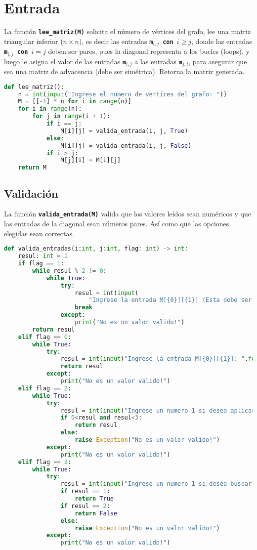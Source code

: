 \section{Entrada}
La función \texttt{\textbf{lee\_matriz(M)}} solicita el número de vértices del grafo, lee una matriz triangular inferior ($n\times n$), es decir las entradas \texttt{\textbf{m$_{i,j}$ con $i\ge j$}}, donde las  entradas \texttt{\textbf{m$_{i,j}$ con $i=j$}} deben ser pares, pues la diagonal representa a los bucles (loops), y luego le asigna el valor de las entradas \texttt{\textbf{m$_{i,j}$}} a las entradas \texttt{\textbf{m$_{j,i}$}}, para asegurar que sea una matriz de adyacencia (debe ser simétrica). Retorna la matriz generada.
\begin{lstlisting}[language=python, caption=Función lee\_matriz()]
def lee_matriz():
    n = int(input("Ingrese el numero de vertices del grafo: "))
    M = [[-1] * n for i in range(n)]
    for i in range(n):
        for j in range(i + 1):
            if i == j:
                M[i][j] = valida_entrada(i, j, True)
            else:
                M[i][j] = valida_entrada(i, j, False)
            if i > j:
                M[j][i] = M[i][j]
    return M
\end{lstlisting}
\subsection{Validación}
La función \texttt{\textbf{valida\_entrada(M)}} valida que los valores leídos sean numéricos y que las entradas de la diagonal sean números pares.
Así como que las opciones elegidas sean correctas.
\begin{lstlisting}[language=python, caption=Función valida\_entrada()]def valida_entradas(i:int, j:int, flag: int) -> int:
    resul: int = 1
    if flag == 1:
        while resul % 2 != 0:
            while True:
                try:
                    resul = int(input(
                        "Ingrese la entrada M[{0}][{1}] (Esta debe ser par): ".format(str(i + 1), str(j + 1))))
                    break
                except:
                    print("No es un valor valido!")
        return resul
    elif flag == 0:
        while True:
            try:
                resul = int(input("Ingrese la entrada M[{0}][{1}]: ".format(str(i + 1), str(j + 1))))
                return resul
            except:
                print("No es un valor valido!")
    elif flag == 2:
        while True:
            try:
                resul = int(input("Ingrese un numero 1 si desea aplicar busqueda en anchura y un 2 si desea aplicar busqueda en profundidad: "))
                if 0<resul and resul<3:
                    return resul
                else:
                    raise Exception("No es un valor valido!")
            except:
                print("No es un valor valido!")
    elif flag == 3:
        while True:
            try:
                resul = int(input("Ingrese un numero 1 si desea buscar otro arbol y un 2 si desea salir: "))
                if resul == 1:
                    return True
                if resul == 2:
                    return False
                else:
                    raise Exception("No es un valor valido!")
            except:
                print("No es un valor valido!")
\end{lstlisting}
